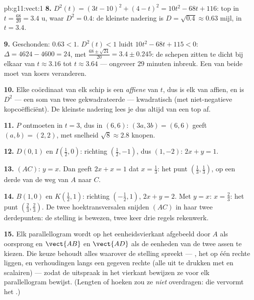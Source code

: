 \begin{solution}{pb:g11:vect:1}
\textbf{8.} $D^2(t) = (3t - 10)^2 + (4 - t)^2 = 10t^2 - 68t + 116$: top in
$t = \frac{68}{20} = 3.4$ u, waar $D^2 = 0.4$: de kleinste nadering is
$D = \sqrt{0.4} \approx 0.63$ mijl, in $t = 3.4$.

\textbf{9.} Geschonden: $0.63 < 1$. $D^2(t) < 1$ luidt
$10t^2 - 68t + 115 < 0$: $\Delta = 4624 - 4600 = 24$, met 
$\frac{68 \pm \sqrt{24}}{20} = 3.4 \pm 0.245$: de schepen zitten te dicht
bij elkaar van $t \approx 3.16$ tot $t \approx 3.64$ --- ongeveer $29$
minuten inbreuk. Een van beide moet van koers veranderen.

\textbf{10.} Elke coördinaat van elk schip is een \emph{affiene}  van
$t$, dus is elk  van  affien, en is $D^2$ --- een som van
twee gekwadrateerde  --- kwadratisch (met niet-negatieve
kopcoëfficiënt). De kleinste nadering lees je dus altijd van een top af.

\textbf{11.} $P$ ontmoeten in $t = 3$, dus in $(6, 6)$: $(3a, 3b) = (6, 6)$
geeft $(a, b) = (2, 2)$, met snelheid $\sqrt{8} \approx 2.8$ knopen.

\textbf{12.} $D(0, 1)$ en $I\left(\frac12, 0\right)$: richting
$\left(\frac12, -1\right)$, dus $(1, -2)$:  $2x + y = 1$.

\textbf{13.} $(AC)$: $y = x$. Dan geeft $2x + x = 1$ dat $x = \frac13$: het
punt $\left(\frac13, \frac13\right)$, op een derde van de weg van $A$ naar
$C$.

\textbf{14.} $B(1, 0)$ en $K\left(\frac12, 1\right)$: richting
$\left(-\frac12, 1\right)$,  $2x + y = 2$. Met $y = x$:
$x = \frac23$: het punt $\left(\frac23, \frac23\right)$. De twee
hoektransversalen snijden $(AC)$ in haar twee derdepunten: de stelling is
bewezen, twee keer drie regels rekenwerk.

\textbf{15.} Elk parallellogram wordt op het eenheidsvierkant afgebeeld door
$A$ als oorsprong en $\vect{AB}$ en $\vect{AD}$ als de eenheden van de twee
assen te kiezen. Die keuze behoudt alles waarover de stelling spreekt ---
, het op één rechte liggen, en verhoudingen langs een gegeven rechte
(alle uit te drukken met  en scalairen) --- zodat de uitspraak in het
vierkant bewijzen ze voor elk parallellogram bewijst. (Lengten of hoeken zou
ze \emph{niet} overdragen: die vervormt het .)


\end{solution}
